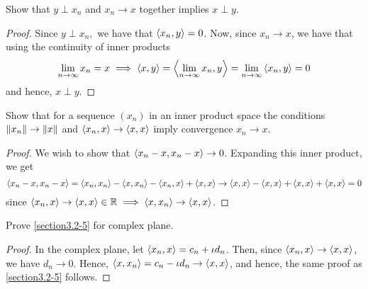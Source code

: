 \begin{question}
    Show that $y \perp x_n$ and $x_n \rightarrow x$ together implies $x \perp y$.
    \label{section3.2-4}
\end{question}
\begin{proof}
    Since $y \perp x_n,$ we have that $\left\langle x_n , y \right\rangle = 0$. Now, since $x_n \rightarrow x$, we have that using the continuity of inner products
    \begin{align*}
        \lim_{n \rightarrow \infty} x_n = x \implies \left\langle x , y \right\rangle = \left\langle  \lim_{n \rightarrow \infty} x_n , y \right\rangle =  \lim_{n \rightarrow \infty} \left\langle x_n , y \right\rangle = 0
    \end{align*}
    and hence, $x \perp y$.
\end{proof}

\begin{question}
    Show that for a sequence $(x_n)$ in an inner product space the conditions $\left\lVert x_n \right\rVert \rightarrow \left\lVert x \right\rVert$ and $\left\langle x_n , x \right\rangle \rightarrow \left\langle x , x \right\rangle$ imply convergence $x_n \rightarrow x$.
    \label{section3.2-5}
\end{question}
\begin{proof}
    We wish to show that $\left\langle x_n - x , x_n - x \right\rangle \rightarrow 0$. Expanding this inner product, we get
    \[\left\langle x_n - x , x_n - x \right\rangle = \left\langle x_n , x_n \right\rangle - \left\langle x , x_n \right\rangle - \left\langle x_n , x \right\rangle + \left\langle x , x \right\rangle \rightarrow \left\langle x , x \right\rangle - \left\langle x , x \right\rangle + \left\langle x , x \right\rangle + \left\langle x , x \right\rangle = 0\]
    since $\left\langle x_n , x \right\rangle \rightarrow \left\langle x , x \right\rangle \in \mathbb{R} \implies \left\langle x , x_n \right\rangle \rightarrow \left\langle x , x \right\rangle$.
\end{proof}

\begin{question}
    Prove \ref{section3.2-5} for complex plane.
    \label{section3.2-6}
\end{question}
\begin{proof}
    In the complex plane, let $\left\langle x_n , x \right\rangle = c_n + \iota d_n$. Then, since $\left\langle x_n , x \right\rangle \rightarrow \left\langle x , x \right\rangle$, we have $d_n \rightarrow 0$. Hence, $\left\langle x , x_n \right\rangle = c_n - \iota d_n \rightarrow \left\langle x , x \right\rangle$, and hence, the same proof as \ref{section3.2-5} follows.
\end{proof}

